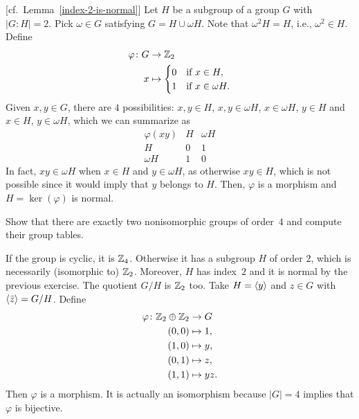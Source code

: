 \begin{solution} {[cf.~Lemma~\ref{index-2-is-normal}]} Let $H$ be a subgroup of a group $G$ with $|G:H|=2$. Pick $\omega\in G$ satisfying $G=H\cup \omega H$. Note that $\omega^2H=H$, i.e., $\omega^2\in H$. Define
\begin{align*}
    \varphi\colon G&\to\mathbb{Z}_2\\
    x &\mapsto  \begin{cases}
        0   &\textrm{if }x\in H,\\
        1   &\textrm{if }x\in\omega H.
    \end{cases}
\end{align*}
Given $x,y\in G$, there are $4$ possibilities: $x,y\in H$, $x,y\in\omega H$, $x\in\omega H$, $y\in H$ and $x\in H$, $y\in\omega H$, which we can summarize as
$$
    \begin{array}{c|cc}
        \varphi(xy) & H & \omega H \\
        \hline
        H & 0 & 1 \\
        \omega H & 1 & 0
    \end{array}
$$
In fact, $xy\in\omega H$ when $x\in H$ and $y\in\omega H$, as otherwise $xy\in H$, which is not possible since it would imply that $y$ belongs to $H$. Then, $\varphi$ is a morphism and $H=\ker(\varphi)$ is normal.  \end{solution}

\begin{exr}
    Show that there are exactly two nonisomorphic groups of order\/~$4$ and compute their group tables.
\end{exr}

\begin{solution} If the group is cyclic, it is $\mathbb{Z}_4$. Otherwise it has a subgroup $H$ of order $2$, which is necessarily (isomorphic to) $\mathbb{Z}_2$. Moreover, $H$ has index~$2$ and it is normal by the previous exercise. The quotient $G/H$ is $\mathbb{Z}_2$ too. Take $H=\langle y\rangle$ and $z\in G$ with $\langle\bar z\rangle=G/H$. Define
\begin{align*}
    \varphi\colon\mathbb{Z}_2\oplus\mathbb{Z}_2&\to G\\
    (0,0)&\mapsto 1,\\
    (1,0)&\mapsto y,\\
    (0,1)&\mapsto z,\\
    (1,1)&\mapsto yz.
\end{align*}
Then $\varphi$ is a morphism. It is actually an isomorphism because $|G|=4$ implies that $\varphi$ is bijective.  \end{solution}

